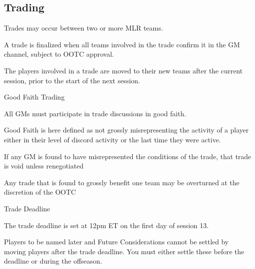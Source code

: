 \subsection{Trading}
\begin{deepEnumerate}
	\item Trades may occur between two or more MLR teams.
	\begin{deepEnumerate}
		\item A trade is finalized when all teams involved in the trade confirm it in the GM channel, subject to OOTC approval.
		\item The players involved in a trade are moved to their new teams after the current session, prior to the start of the next session.
	\end{deepEnumerate}
	\item Good Faith Trading
	\begin{deepEnumerate}
		\item All GMs must participate in trade discussions in good faith.
			\begin{deepEnumerate}
			\item Good Faith is here defined as not grossly misrepresenting the activity of a player either in their level of discord activity or the last time they were active.
			\end{deepEnumerate}
		\item If any GM is found to have misrepresented the conditions of the trade, that trade is void unless renegotiated
		\item Any trade that is found to grossly benefit one team may be overturned at the discretion of the OOTC 
	\end{deepEnumerate}
	\item Trade Deadline
	\begin{deepEnumerate}
		\item The trade deadline is set at 12pm ET on the first day of session 13.
		\item Players to be named later and Future Considerations cannot be settled by moving players after the trade deadline.
		You must either settle these before the deadline or during the offseason.
	\end{deepEnumerate}
\end{deepEnumerate}


